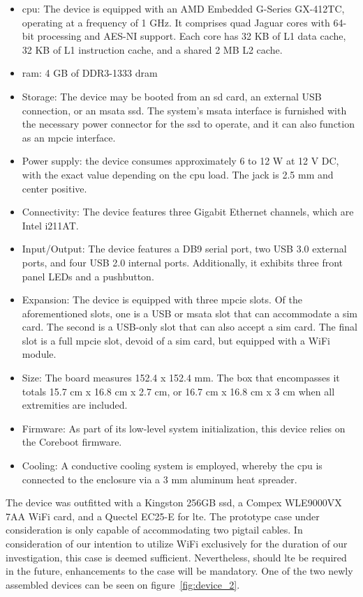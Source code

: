 \begin{itemize}
    \item \gls{cpu}: The device is equipped with an AMD Embedded G-Series GX-412TC, operating at a frequency of 1 GHz. It comprises quad Jaguar cores with 64-bit processing and AES-NI support. Each core has 32 KB of L1 data cache, 32 KB of L1 instruction cache, and a shared 2 MB L2 cache.
    \item \gls{ram}: 4 GB of DDR3-1333 \gls{dram}
    \item Storage: The device may be booted from an \gls{sd} card, an external USB connection, or an \gls{msata} \gls{ssd}. The system's \gls{msata} interface is furnished with the necessary power connector for the \gls{ssd} to operate, and it can also function as an \gls{mpcie} interface.
    \item Power supply: the device consumes approximately 6 to 12 W at 12 V DC, with the exact value depending on the \gls{cpu} load. The jack is 2.5 mm and center positive.
    \item Connectivity: The device features three Gigabit Ethernet channels, which are Intel i211AT.
    \item Input/Output: The device features a DB9 serial port, two USB 3.0 external ports, and four USB 2.0 internal ports. Additionally, it exhibits three front panel LEDs and a pushbutton.
    \item Expansion: The device is equipped with three \gls{mpcie} slots. Of the aforementioned slots, one is a USB or \gls{msata} slot that can accommodate a \gls{sim} card. The second is a USB-only slot that can also accept a \gls{sim} card. The final slot is a full \gls{mpcie} slot, devoid of a \gls{sim} card, but equipped with a WiFi module.
    \item Size: The board measures 152.4 x 152.4 mm. The box that encompasses it totals 15.7 cm x 16.8 cm x 2.7 cm, or 16.7 cm x 16.8 cm x 3 cm when all extremities are included.
    \item Firmware: As part of its low-level system initialization, this device relies on the Coreboot firmware.
    \item Cooling: A conductive cooling system is employed, whereby the \gls{cpu} is connected to the enclosure via a 3 mm aluminum heat spreader.
\end{itemize}

The device was outfitted with a Kingston 256GB \gls{ssd}, a Compex WLE9000VX 7AA WiFi card, and a Quectel EC25-E for \gls{lte}. The prototype case under consideration is only capable of accommodating two pigtail cables. In consideration of our intention to utilize WiFi exclusively for the duration of our investigation, this case is deemed sufficient. Nevertheless, should \gls{lte} be required in the future, enhancements to the case will be mandatory. One of the two newly assembled devices can be seen on figure~\ref{fig:device_2}.

